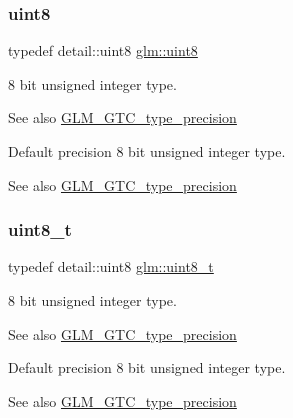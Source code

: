 \subsubsection{\texorpdfstring{uint8}{uint8}}
{\footnotesize\ttfamily typedef detail\+::uint8 \hyperlink{group__gtc__type__precision_ga1a7dcd8aac97cc8020817c94049deff2}{glm\+::uint8}}

8 bit unsigned integer type. \begin{DoxySeeAlso}{See also}
\hyperlink{group__gtc__type__precision}{G\+L\+M\+\_\+\+G\+T\+C\+\_\+type\+\_\+precision}
\end{DoxySeeAlso}
Default precision 8 bit unsigned integer type. \begin{DoxySeeAlso}{See also}
\hyperlink{group__gtc__type__precision}{G\+L\+M\+\_\+\+G\+T\+C\+\_\+type\+\_\+precision} 
\end{DoxySeeAlso}
\mbox{\label{group__gtc__type__precision_ga93adf6dd9803408f3e3aaf9dedda352b}} 
\subsubsection{\texorpdfstring{uint8\+\_\+t}{uint8\_t}}
{\footnotesize\ttfamily typedef detail\+::uint8 \hyperlink{group__gtc__type__precision_ga93adf6dd9803408f3e3aaf9dedda352b}{glm\+::uint8\+\_\+t}}

8 bit unsigned integer type. \begin{DoxySeeAlso}{See also}
\hyperlink{group__gtc__type__precision}{G\+L\+M\+\_\+\+G\+T\+C\+\_\+type\+\_\+precision}
\end{DoxySeeAlso}
Default precision 8 bit unsigned integer type. \begin{DoxySeeAlso}{See also}
\hyperlink{group__gtc__type__precision}{G\+L\+M\+\_\+\+G\+T\+C\+\_\+type\+\_\+precision} 
\end{DoxySeeAlso}
